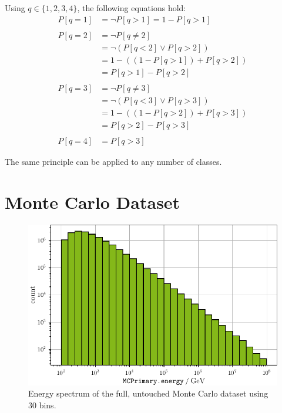 Using $q \in \{1, 2, 3, 4\}$,
the following equations hold:
\begin{align*}
  P[q=1] &= \neg P[q>1] = 1 - P[q>1] \\
  \\
  P[q=2] &= \neg P[q≠2] \\
  &= \neg(P[q<2] \lor P[q>2]) \\
  &= 1 - ((1 - P[q>1]) + P[q>2]) \\
  &= P[q>1] - P[q>2] \\
  \\
  P[q=3] &= \neg P[q≠3] \\
  &= \neg(P[q<3] \lor P[q>3]) \\
  &= 1 - ((1 - P[q>2]) + P[q>3]) \\
  &= P[q>2] - P[q>3] \\
  \\
  P[q=4] &= P[q>3] %
\end{align*}

The same principle can be applied to any number of classes.


\clearpage
\section{Monte Carlo Dataset}
\begin{figure}
  \centering
  \includegraphics[scale=1]{content/plots/dataset:raw:histogram_full.pdf}
  \caption{Energy spectrum of the full, untouched Monte Carlo dataset using 30 bins.}
  \label{fig:dataset:raw:histogram}
\end{figure}


\clearpage
